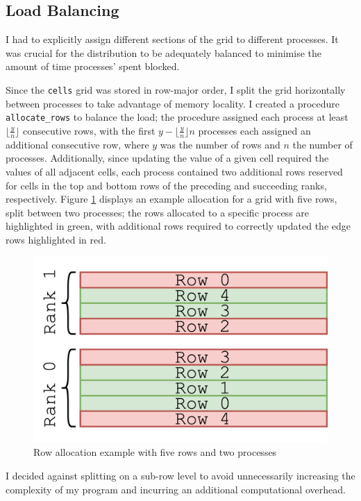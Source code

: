 \documentclass[twocolumn, a4paper]{article}
\begin{document}
\subsection{Load Balancing}

I had to explicitly assign different sections of the grid to different processes.
It was crucial for the distribution to be adequately balanced to minimise the amount of time processes' spent blocked.

Since the \texttt{cells} grid was stored in row-major order, I split the grid horizontally between processes to take advantage of memory locality.
I created a procedure \texttt{allocate\_rows} to balance the load; the procedure assigned each process at least $\lfloor\frac{y}{n}\rfloor$ consecutive rows, with the first $y - \lfloor\frac{y}{n}\rfloor n$ processes each assigned an additional consecutive row, where $y$ was the number of rows and $n$ the number of processes.
Additionally, since updating the value of a given cell required the values of all adjacent cells, each process contained two additional rows reserved for cells in the top and bottom rows of the preceding and succeeding ranks, respectively.
Figure \ref{fig:rows} displays an example allocation for a grid with five rows, split between two processes; the rows allocated to a specific process are highlighted in green, with additional rows required to correctly updated the edge rows highlighted in red.

\begin{figure}[htbp]
  \centering
  \includegraphics[width=.75\linewidth]{rows.png}
  \caption{Row allocation example with five rows and two processes}\label{fig:rows}
\end{figure}

I decided against splitting on a sub-row level to avoid unnecessarily increasing the complexity of my program and incurring an additional computational overhead.
\end{document}
